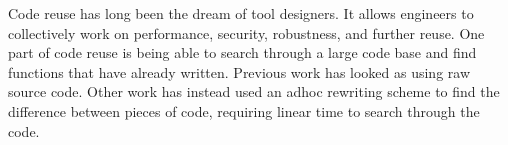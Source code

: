Code reuse has long been the dream of tool designers.
It allows engineers to collectively work on performance, security, robustness, and further reuse.
One part of code reuse is being able to search through a large code base and find functions that have already written.
Previous work \cite{cox} has looked as using raw source code.
Other work \cite{mitchell:hoogle_16_may_2011} has instead used an adhoc rewriting scheme to find the difference between pieces of code,
requiring linear time to search through the code.